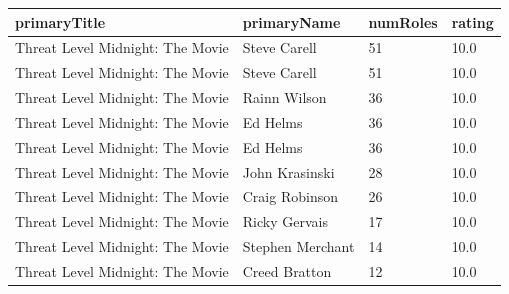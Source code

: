 \documentclass[
  letterpaper,
  DIV=11,
  numbers=noendperiod]{scrreprt}
\begin{document}
\begin{longtable}[]{@{}llll@{}}
\toprule\noalign{}
primaryTitle & primaryName & numRoles & rating \\
\midrule\noalign{}
\endhead
\bottomrule\noalign{}
\endlastfoot
Threat Level Midnight: The Movie & Steve Carell & 51 & 10.0 \\
Threat Level Midnight: The Movie & Steve Carell & 51 & 10.0 \\
Threat Level Midnight: The Movie & Rainn Wilson & 36 & 10.0 \\
Threat Level Midnight: The Movie & Ed Helms & 36 & 10.0 \\
Threat Level Midnight: The Movie & Ed Helms & 36 & 10.0 \\
Threat Level Midnight: The Movie & John Krasinski & 28 & 10.0 \\
Threat Level Midnight: The Movie & Craig Robinson & 26 & 10.0 \\
Threat Level Midnight: The Movie & Ricky Gervais & 17 & 10.0 \\
Threat Level Midnight: The Movie & Stephen Merchant & 14 & 10.0 \\
Threat Level Midnight: The Movie & Creed Bratton & 12 & 10.0 \\
\end{longtable}
\end{document}
